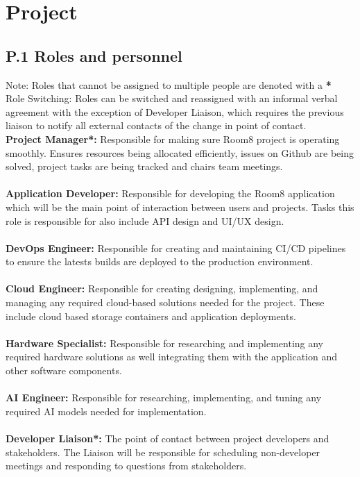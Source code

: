 \documentclass{scrreprt}
\newcommand*{\nsection}[1]{
    \section*{#1}
    \addcontentsline{toc}{section}{#1}
}
\theoremstyle{definition}
\begin{document}
\chapter*{Project}
\setcounter{mtc}{4}
\minitoc%


\nsection{P.1 Roles and personnel}
Note: Roles that cannot be assigned to multiple people are denoted with a \textbf{*}\\
\newline Role Switching: Roles can be switched and reassigned with an informal verbal agreement with the exception of Developer Liaison, which requires the previous liaison to notify all external contacts of the change in point of contact.\\
\newline\textbf{Project Manager*: }Responsible for making sure Room8 project is operating smoothly. Ensures resources being allocated efficiently, issues on Github are being solved, project tasks are being tracked and chairs team meetings.\\
\\
\textbf{Application Developer: }Responsible for developing the Room8 application which will be the main point of interaction between users and projects. Tasks this role is responsible for also include API design and UI/UX design.\\
\\
\textbf{DevOps Engineer: }Responsible for creating and maintaining CI/CD pipelines to ensure the latests builds are deployed to the production environment.\\
\\
\textbf{Cloud Engineer: }Responsible for creating designing, implementing, and managing any required cloud-based solutions needed for the project. These include cloud based storage containers and application deployments.\\
\\
\textbf{Hardware Specialist: }Responsible for researching and implementing any required hardware solutions as well integrating them with the application and other software components.\\
\\
\textbf{AI Engineer: }Responsible for researching, implementing, and tuning any required AI models needed for implementation.\\
\\
\textbf{Developer Liaison*: }The point of contact between project developers and stakeholders. The Liaison will be responsible for scheduling non-developer meetings and responding to questions from stakeholders. \\
\\
\end{document}
